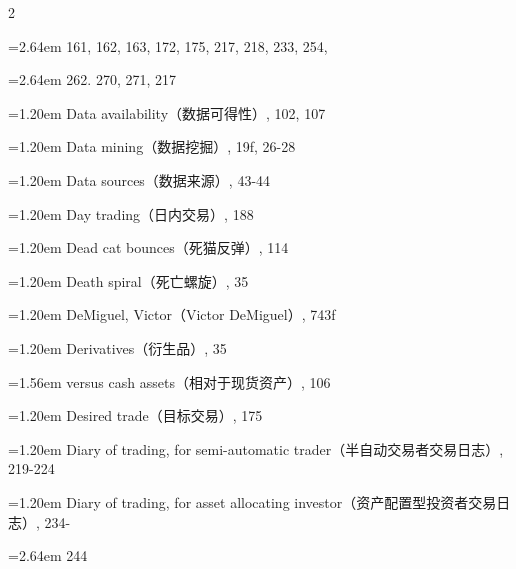 {\begin{multicols}{2}
\par \noindent\hangindent=2.64em\hspace*{1.44em} 161, 162, 163, 172, 175, 217, 218, 233, 254,
\par \noindent\hangindent=2.64em\hspace*{1.44em} 262. 270, 271, 217
\par \noindent\hangindent=1.20em\hspace*{0.00em} Data availability（数据可得性）, 102, 107
\par \noindent\hangindent=1.20em\hspace*{0.00em} Data mining（数据挖掘）, 19f, 26-28
\par \noindent\hangindent=1.20em\hspace*{0.00em} Data sources（数据来源）, 43-44
\par \noindent\hangindent=1.20em\hspace*{0.00em} Day trading（日内交易）, 188
\par \noindent\hangindent=1.20em\hspace*{0.00em} Dead cat bounces（死猫反弹）, 114
\par \noindent\hangindent=1.20em\hspace*{0.00em} Death spiral（死亡螺旋）, 35
\par \noindent\hangindent=1.20em\hspace*{0.00em} DeMiguel, Victor（Victor DeMiguel）, 743f
\par \noindent\hangindent=1.20em\hspace*{0.00em} Derivatives（衍生品）, 35
\par \noindent\hangindent=1.56em\hspace*{0.36em} versus cash assets（相对于现货资产）, 106
\par \noindent\hangindent=1.20em\hspace*{0.00em} Desired trade（目标交易）, 175
\par \noindent\hangindent=1.20em\hspace*{0.00em} Diary of trading, for semi-automatic trader（半自动交易者交易日志）, 219-224
\par \noindent\hangindent=1.20em\hspace*{0.00em} Diary of trading, for asset allocating investor（资产配置型投资者交易日志）, 234-
\par \noindent\hangindent=2.64em\hspace*{1.44em} 244

\end{multicols}}
